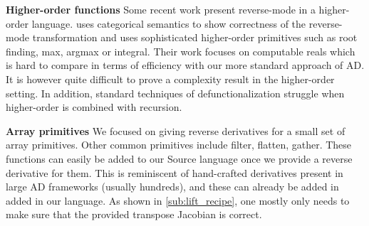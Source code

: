 

\noindent \textbf{Higher-order functions}
Some recent work \cite{vakar2020reverse,sherman2021} present reverse-mode in a higher-order language.
\cite{vakar2020reverse} uses categorical semantics to show correctness of the reverse-mode transformation 
and \cite{sherman2021} uses sophisticated higher-order primitives such as root finding, max, argmax or integral. 
Their work focuses on computable reals which is hard to compare in terms of efficiency with our more standard approach of AD.
It is however quite difficult to prove a complexity result in the higher-order setting. 
In addition, standard techniques of defunctionalization struggle when higher-order is combined with recursion.

\noindent \textbf{Array primitives}
We focused on giving reverse derivatives for a small set of array primitives. 
Other common primitives include filter, flatten, gather. 
These functions can easily be added to our Source language once we provide a reverse derivative for them.
This is reminiscent of hand-crafted derivatives present in large AD frameworks (usually hundreds), 
and these can already be added in added in our language. 
As shown in \ref{sub:lift_recipe}, one mostly only needs to make sure that the provided transpose Jacobian is correct.



